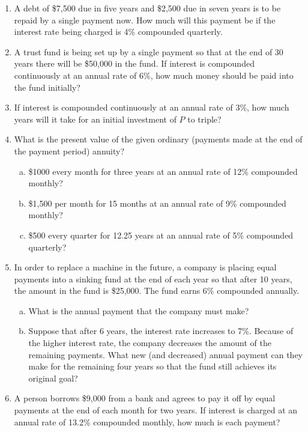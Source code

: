 \documentclass[11pt]{exam}
\begin{document}
\begin{enumerate}
\item A debt of \$7,500 due in five years and \$2,500 due in seven years is to be repaid by a single payment now.  How much will this payment be if the interest rate being charged is 4\% compounded quarterly.

\item A trust fund is being set up by a single payment so that at the end of 30 years there will be \$50,000 in the fund.  If interest is compounded continuously at an annual rate of 6\%, how much money should be paid into the fund initially?

\item If interest is compounded continuously at an annual rate of 3\%, how much years will it take for an initial investment of $P$ to triple?
\newpage

\item What is the present value of the given ordinary (payments made at the end of the payment period) annuity?
\begin{enumerate}[(a)]
\item \$1000 every month for three years at an annual rate of 12\% compounded monthly?
\item \$1,500 per month for 15 months at an annual rate of 9\% compounded monthly?
\item \$500 every quarter for 12.25 years at an annual rate of 5\% compounded quarterly?
\end{enumerate}

\item In order to replace a machine in the future, a company is placing equal payments into a sinking fund at the end of each year so that after 10 years, the amount in the fund is \$25,000.  The fund earns 6\% compounded annually.
\begin{enumerate}[(a)]
\item What is the annual payment that the company must make?
\item Suppose that after 6 years, the interest rate increases to 7\%.  Because of the higher interest rate, the company decreases the amount of the remaining payments.  What new (and decreased) annual payment can they make for the remaining four years so that the fund still achieves its original goal?
\end{enumerate}

\item A person borrows \$9,000 from a bank and agrees to pay it off by equal payments at the end of each month for two years.  If interest is charged at an annual rate of 13.2\% compounded monthly, how much is each payment?


\end{enumerate}
\end{document}
